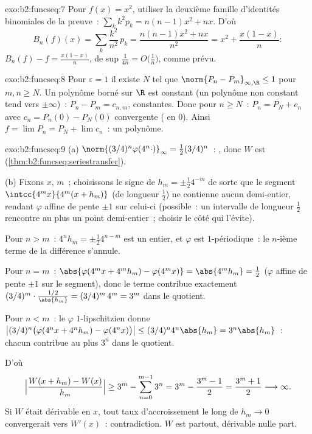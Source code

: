 \begin{solution}{exo:b2:funcseq:7}
Pour $f(x) = x^2$, utiliser la deuxième famille d'identités
binomiales de la preuve~: $\sum_k k^2 p_k = n(n-1)x^2 + nx$. D'où
\[
B_n(f)(x) = \sum_k \frac{k^2}{n^2}\,p_k
= \frac{n(n-1)x^2 + nx}{n^2}
= x^2 + \frac{x(1 - x)}{n} :
\]
$B_n(f) - f = \frac{x(1-x)}{n}$, de  sup $\frac{1}{4n} =
O\bigl(\frac1n\bigr)$, comme prévu.
\end{solution}

\begin{solution}{exo:b2:funcseq:8}
Pour $\varepsilon = 1$ il existe $N$ tel que $\norm{P_n - P_m}_{\infty,
\R} \leq 1$ pour $m, n \geq N$. Un polynôme borné sur $\R$ est
constant (un polynôme non constant tend vers $\pm\infty$)~: $P_n - P_m =
c_{n,m}$, constantes. Donc pour $n \geq N$~: $P_n = P_N + c_n$ avec
$c_n = P_n(0) - P_N(0)$ convergente ( en $0$).
Ainsi $f = \lim P_n = P_N + \lim c_n$~: un polynôme.
\end{solution}

\begin{solution}{exo:b2:funcseq:9}
(a) $\norm{(3/4)^n\varphi(4^n\cdot)}_\infty = \frac12
(3/4)^n$~: , donc $W$ est 
(\cref{thm:b2:funcseq:seriestransfer}).

(b) Fixons $x$, $m$~; choisissons le signe de $h_m = \pm\frac12 4^{-m}$
de sorte que le segment $\intcc{4^mx}{4^m(x + h_m)}$ (de longueur
$\frac12$) ne contienne aucun demi-entier, rendant $\varphi$ affine de
pente $\pm1$ sur celui-ci (possible~: un intervalle de longueur
$\frac12$ rencontre au plus un point demi-entier~; choisir le côté qui
l'évite).

Pour $n > m$~: $4^n h_m = \pm\frac12 4^{n-m}$ est un entier, et
$\varphi$ est $1$-périodique~: le $n$-ième terme de la différence
s'annule.

Pour $n = m$~: $\abs{\varphi(4^m x + 4^m h_m) - \varphi(4^m x)} =
\abs{4^m h_m} = \frac12$ ($\varphi$ affine de pente $\pm 1$ sur le
segment), donc le terme contribue exactement $(3/4)^m \cdot
\frac{1/2}{\abs{h_m}} = (3/4)^m\,4^m = 3^m$ dans le quotient.

Pour $n < m$~: le $\varphi$ $1$-lipschitzien donne
$\bigl|(3/4)^n\bigl(\varphi(4^nx + 4^nh_m) -
\varphi(4^nx)\bigr)\bigr| \leq (3/4)^n 4^n\abs{h_m} =
3^n\abs{h_m}$~: chacun contribue au plus $3^n$ dans le quotient.

D'où
\[
\Bigl|\frac{W(x + h_m) - W(x)}{h_m}\Bigr|
\geq 3^m - \sum_{n=0}^{m-1} 3^n
= 3^m - \frac{3^m - 1}{2} = \frac{3^m + 1}{2}
\longrightarrow \infty .
\]
Si $W$ était dérivable en $x$, tout taux d'accroissement le long de
$h_m \to 0$ convergerait vers $W'(x)$~: contradiction. $W$ est
 partout, dérivable nulle part.
\end{solution}

